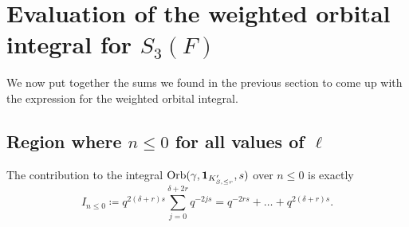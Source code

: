\chapter{Evaluation of the weighted orbital integral for $S_3(F)$}
\label{ch:orbital2}

We now put together the sums we found in the previous section
to come up with the expression for the weighted orbital integral.

\section{Region where $n \leq 0$ for all values of $\ell$}
\begin{proposition}
  The contribution to the integral $\operatorname{Orb}(\gamma, \mathbf{1}_{K'_{S, \le r}}, s)$ over $n \leq 0$ is exactly
  \[ I_{n \le 0} \coloneqq q^{2(\delta+r)s} \sum_{j=0}^{\delta+2r} q^{-2js}
    = q^{-2rs} + \dots + q^{2(\delta+r)s}. \]
\end{proposition}
